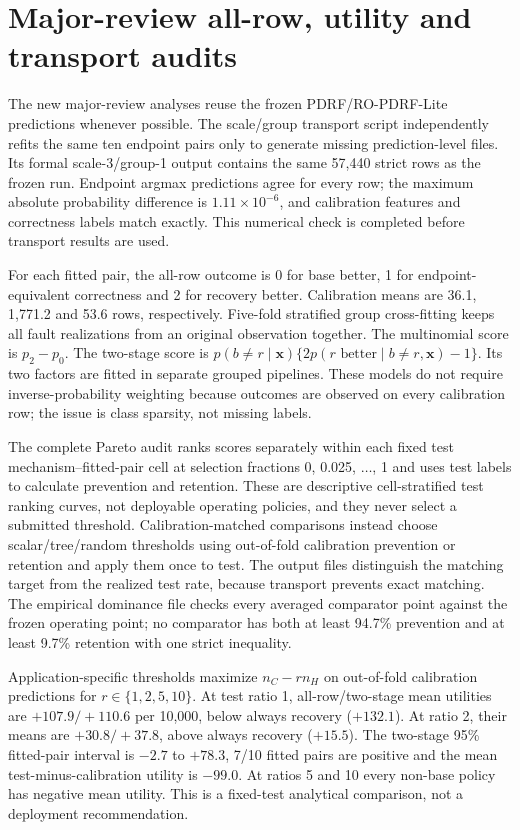 \documentclass[10pt]{article}
\begin{document}
\section{Major-review all-row, utility and transport audits}

The new major-review analyses reuse the frozen PDRF/RO-PDRF-Lite predictions whenever possible. The scale/group transport script independently refits the same ten endpoint pairs only to generate missing prediction-level files. Its formal scale-3/group-1 output contains the same 57,440 strict rows as the frozen run. Endpoint argmax predictions agree for every row; the maximum absolute probability difference is $1.11\times10^{-6}$, and calibration features and correctness labels match exactly. This numerical check is completed before transport results are used.

For each fitted pair, the all-row outcome is 0 for base better, 1 for endpoint-equivalent correctness and 2 for recovery better. Calibration means are 36.1, 1,771.2 and 53.6 rows, respectively. Five-fold stratified group cross-fitting keeps all fault realizations from an original observation together. The multinomial score is $p_2-p_0$. The two-stage score is $p(b\ne r\mid\mathbf x)\{2p(r\text{ better}\mid b\ne r,\mathbf x)-1\}$. Its two factors are fitted in separate grouped pipelines. These models do not require inverse-probability weighting because outcomes are observed on every calibration row; the issue is class sparsity, not missing labels.

The complete Pareto audit ranks scores separately within each fixed test mechanism--fitted-pair cell at selection fractions 0, 0.025, $\ldots$, 1 and uses test labels to calculate prevention and retention. These are descriptive cell-stratified test ranking curves, not deployable operating policies, and they never select a submitted threshold. Calibration-matched comparisons instead choose scalar/tree/random thresholds using out-of-fold calibration prevention or retention and apply them once to test. The output files distinguish the matching target from the realized test rate, because transport prevents exact matching. The empirical dominance file checks every averaged comparator point against the frozen operating point; no comparator has both at least 94.7\% prevention and at least 9.7\% retention with one strict inequality.

Application-specific thresholds maximize $n_C-rn_H$ on out-of-fold calibration predictions for $r\in\{1,2,5,10\}$. At test ratio 1, all-row/two-stage mean utilities are $+107.9/+110.6$ per 10,000, below always recovery ($+132.1$). At ratio 2, their means are $+30.8/+37.8$, above always recovery ($+15.5$). The two-stage 95\% fitted-pair interval is $-2.7$ to $+78.3$, 7/10 fitted pairs are positive and the mean test-minus-calibration utility is $-99.0$. At ratios 5 and 10 every non-base policy has negative mean utility. This is a fixed-test analytical comparison, not a deployment recommendation.
\end{document}
